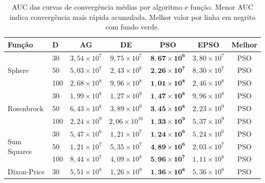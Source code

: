 \documentclass[runningheads]{llncs}
\begin{document}
\begin{table}[H]
\caption{AUC das curvas de convergência médias por algoritmo e função.
Menor AUC indica convergência mais rápida acumulada. Melhor valor por
linha em negrito com fundo verde.}
\label{tab:auc}
\centering
\scriptsize
\setlength{\tabcolsep}{4pt}
\begin{tabular}{llccccc}
\toprule
\textbf{Função} & \textbf{D} &
\textbf{AG} & \textbf{DE} & \textbf{PSO} & \textbf{EPSO} & \textbf{Melhor} \\
\midrule
\multirow{3}{*}{Sphere}
  & 30  & $3{,}54{\times}10^{7}$ & $9{,}75{\times}10^{7}$ & \cellcolor{green!20}$\mathbf{8{,}67{\times}10^{6}}$ & $3{,}80{\times}10^{7}$ & PSO \\
  & 50  & $5{,}03{\times}10^{7}$ & $2{,}43{\times}10^{8}$ & \cellcolor{green!20}$\mathbf{2{,}26{\times}10^{7}}$ & $8{,}30{\times}10^{7}$ & PSO \\
  & 100 & $2{,}68{\times}10^{8}$ & $9{,}96{\times}10^{8}$ & \cellcolor{green!20}$\mathbf{1{,}01{\times}10^{8}}$ & $2{,}46{\times}10^{8}$ & PSO \\
\midrule
\multirow{3}{*}{Rosenbrock}
  & 30  & $1{,}99{\times}10^{8}$ & $1{,}27{\times}10^{9}$ & \cellcolor{green!20}$\mathbf{1{,}47{\times}10^{8}}$ & $9{,}96{\times}10^{8}$ & PSO \\
  & 50  & $6{,}43{\times}10^{8}$ & $3{,}89{\times}10^{9}$ & \cellcolor{green!20}$\mathbf{3{,}45{\times}10^{8}}$ & $2{,}23{\times}10^{9}$ & PSO \\
  & 100 & $2{,}24{\times}10^{9}$ & $2{,}06{\times}10^{10}$ & \cellcolor{green!20}$\mathbf{1{,}33{\times}10^{9}}$ & $5{,}37{\times}10^{9}$ & PSO \\
\midrule
\multirow{3}{*}{Sum Squares}
  & 30  & $5{,}47{\times}10^{6}$ & $1{,}21{\times}10^{7}$ & \cellcolor{green!20}$\mathbf{1{,}24{\times}10^{6}}$ & $5{,}24{\times}10^{6}$ & PSO \\
  & 50  & $1{,}21{\times}10^{7}$ & $5{,}35{\times}10^{7}$ & \cellcolor{green!20}$\mathbf{4{,}89{\times}10^{6}}$ & $2{,}03{\times}10^{7}$ & PSO \\
  & 100 & $8{,}44{\times}10^{7}$ & $4{,}09{\times}10^{8}$ & \cellcolor{green!20}$\mathbf{5{,}96{\times}10^{7}}$ & $1{,}11{\times}10^{8}$ & PSO \\
\midrule
\multirow{3}{*}{Dixon-Price}
  & 30  & $5{,}51{\times}10^{8}$ & $1{,}26{\times}10^{9}$ & \cellcolor{green!20}$\mathbf{1{,}36{\times}10^{8}}$ & $5{,}36{\times}10^{8}$ & PSO \\

\end{tabular}
\end{table}
\end{document}
